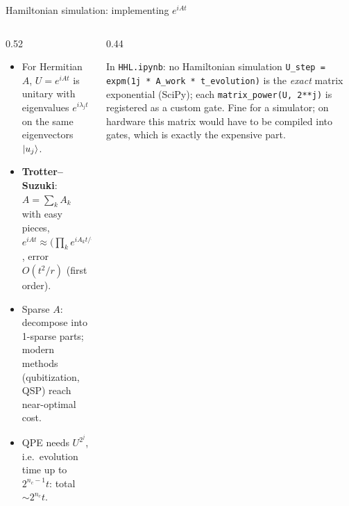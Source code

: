 \documentclass[aspectratio=169,11pt]{beamer}
\newcommand{\key}[1]{{\color{qdark}\textbf{#1}}}
\begin{document}
\begin{frame}{Hamiltonian simulation: implementing $e^{iAt}$}
  \begin{columns}[T]
    \begin{column}{0.52\textwidth}
      \small
      \begin{itemize}
        \item For Hermitian $A$, $U = e^{iAt}$ is unitary with eigenvalues $e^{i\lambda_jt}$ on the same eigenvectors $\ket{u_j}$.
        \item \key{Trotter--Suzuki}: $A = \sum_kA_k$ with easy pieces,
          $e^{iAt} \approx \big(\prod_ke^{iA_kt/r}\big)^r$, error $O(t^2/r)$ (first order).
        \item Sparse $A$: decompose into 1-sparse parts; modern methods (qubitization, QSP) reach near-optimal cost.
        \item QPE needs $U^{2^j}$, i.e.\ evolution time up to $2^{n_c-1}t$: total $\sim2^{n_c}t$.
      \end{itemize}
    \end{column}
    \begin{column}{0.44\textwidth}
      \begin{alertblock}{In \texttt{HHL.ipynb}: no Hamiltonian simulation}
        \footnotesize
        \texttt{U\_step = expm(1j * A\_work * t\_evolution)} is the \emph{exact} matrix exponential (SciPy); each
        \texttt{matrix\_power(U, 2**j)} is registered as a custom gate. Fine for a simulator; on hardware this matrix would have to
        be compiled into gates, which is exactly the expensive part.
      \end{alertblock}
    \end{column}
  \end{columns}
\end{frame}
\end{document}
